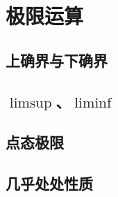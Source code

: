 \section{极限运算}
\label{b1:sec:0402}


\subsection{上确界与下确界}
\label{b1:subsec:040201}

\subsection{\texorpdfstring{\(\limsup\)}{limsup}、\texorpdfstring{\(\liminf\)}{liminf}}
\label{b1:subsec:040202}

\subsection{点态极限}
\label{b1:subsec:040203}

\subsection{几乎处处性质}
\label{b1:subsec:040204}


